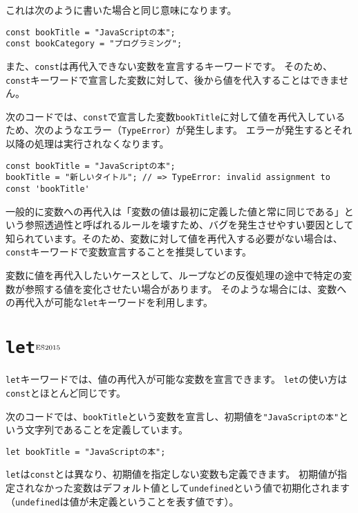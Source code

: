 これは次のように書いた場合と同じ意味になります。

\begin{lstlisting}
const bookTitle = "JavaScriptの本";
const bookCategory = "プログラミング";
\end{lstlisting}

また、\texttt{const}は再代入できない変数を宣言するキーワードです。
そのため、\texttt{const}キーワードで宣言した変数に対して、後から値を代入することはできません。

次のコードでは、\texttt{const}で宣言した変数\texttt{bookTitle}に対して値を再代入しているため、次のようなエラー（\texttt{TypeError}）が発生します。
エラーが発生するとそれ以降の処理は実行されなくなります。

\begin{lstlisting}
const bookTitle = "JavaScriptの本";
bookTitle = "新しいタイトル"; // => TypeError: invalid assignment to const 'bookTitle'
\end{lstlisting}

一般的に変数への再代入は「変数の値は最初に定義した値と常に同じである」という参照透過性と呼ばれるルールを壊すため、バグを発生させやすい要因として知られています。そのため、変数に対して値を再代入する必要がない場合は、\texttt{const}キーワードで変数宣言することを推奨しています。

変数に値を再代入したいケースとして、ループなどの反復処理の途中で特定の変数が参照する値を変化させたい場合があります。
そのような場合には、変数への再代入が可能な\texttt{let}キーワードを利用します。

\hypertarget{let}{%
\section{\texttt{let}$^{\rm ES2015}$}\label{let}}

\texttt{let}キーワードでは、値の再代入が可能な変数を宣言できます。
\texttt{let}の使い方は\texttt{const}とほとんど同じです。

次のコードでは、\texttt{bookTitle}という変数を宣言し、初期値を\texttt{"JavaScriptの本"}という文字列であることを定義しています。

\begin{lstlisting}
let bookTitle = "JavaScriptの本";
\end{lstlisting}

\texttt{let}は\texttt{const}とは異なり、初期値を指定しない変数も定義できます。
初期値が指定されなかった変数はデフォルト値として\texttt{undefined}という値で初期化されます（\texttt{undefined}は値が未定義ということを表す値です）。

